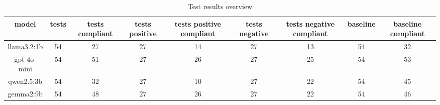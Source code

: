
  \begin{table}[h!]
  \centering
  \begin{tabular}{|c|c|c|c|c|c|c|c|c|}
  \hline
  model & tests & tests compliant & tests positive & tests positive compliant & tests negative & tests negative compliant & baseline & baseline compliant \\
  \hline
  llama3.2:1b & 54 & 27 & 27 & 14 & 27 & 13 & 54 & 32\\
\hline
gpt-4o-mini & 54 & 51 & 27 & 26 & 27 & 25 & 54 & 53\\
\hline
qwen2.5:3b & 54 & 32 & 27 & 10 & 27 & 22 & 54 & 45\\
\hline
gemma2:9b & 54 & 48 & 27 & 26 & 27 & 22 & 54 & 46
  \end{tabular}
  \caption{Test results overview}
  
  \end{table}
  